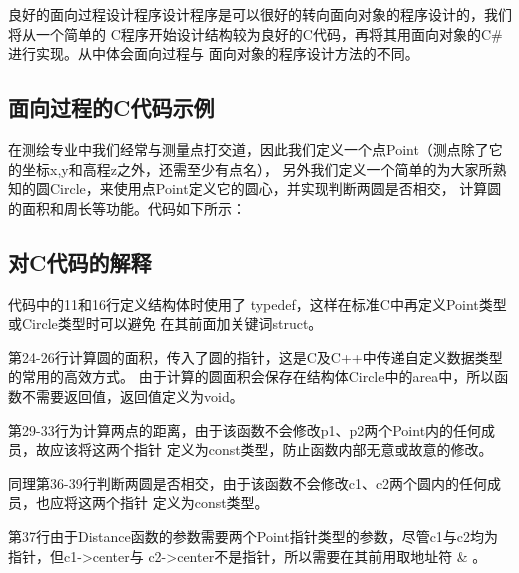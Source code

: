 良好的面向过程设计程序设计程序是可以很好的转向面向对象的程序设计的，我们将从一个简单的
C程序开始设计结构较为良好的C代码，再将其用面向对象的C\#进行实现。从中体会面向过程与
面向对象的程序设计方法的不同。

 \subsection{面向过程的C代码示例}

在测绘专业中我们经常与测量点打交道，因此我们定义一个点Point（测点除了它的坐标x,y和高程z之外，还需至少有点名），
 另外我们定义一个简单的为大家所熟知的圆Circle，来使用点Point定义它的圆心，并实现判断两圆是否相交，
 计算圆的面积和周长等功能。代码如下所示：





% 
% 
% 

\subsection{对C代码的解释}
代码中的11和16行定义结构体时使用了 typedef，这样在标准C中再定义Point类型或Circle类型时可以避免
在其前面加关键词struct。

第24-26行计算圆的面积，传入了圆的指针，这是C及C++中传递自定义数据类型的常用的高效方式。
由于计算的圆面积会保存在结构体Circle中的area中，所以函数不需要返回值，返回值定义为void。

第29-33行为计算两点的距离，由于该函数不会修改p1、p2两个Point内的任何成员，故应该将这两个指针
定义为const类型，防止函数内部无意或故意的修改。

同理第36-39行判断两圆是否相交，由于该函数不会修改c1、c2两个圆内的任何成员，也应将这两个指针
定义为const类型。

第37行由于Distance函数的参数需要两个Point指针类型的参数，尽管c1与c2均为指针，但c1->center与
c2->center不是指针，所以需要在其前用取地址符 \& 。

